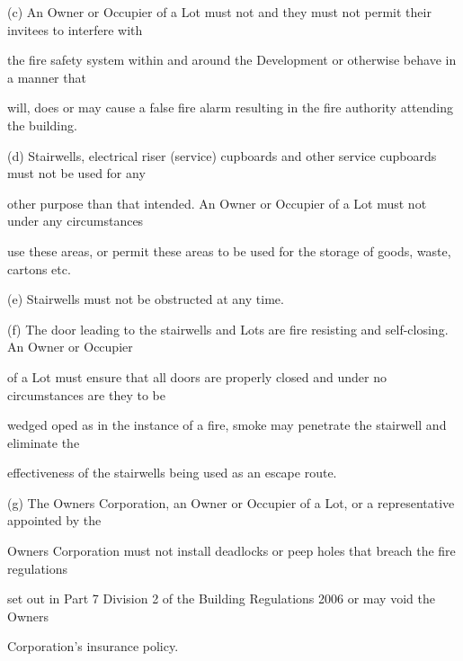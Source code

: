 \documentclass{article}
\begin{document}
{\fontsize{9.962}{1}(c) An Owner or Occupier of a Lot must not and they must not permit their invitees to interfere with }

{\fontsize{10.02}{1}the fire safety system within and around the Development or otherwise behave in a manner that }

{\fontsize{10.02}{1}will, does or may cause a false fire alarm resulting in the fire authority attending the building. }

\newpage



















{\fontsize{9.962}{1}(d) Stairwells, electrical riser (service) cupboards and other service cupboards must not be used for any }

{\fontsize{10.02}{1}other purpose than that intended. An Owner or Occupier of a Lot must not under any circumstances }

{\fontsize{10.02}{1}use these areas, or permit these areas to be used for the storage of goods, waste, cartons etc. }

{\fontsize{9.962}{1}(e) Stairwells must not be obstructed at any time. }

{\fontsize{9.962}{1}(f) The door leading to the stairwells and Lots are fire resisting and self-closing. An Owner or Occupier }

{\fontsize{10.02}{1}of a Lot must ensure that all doors are properly closed and under no circumstances are they to be }

{\fontsize{10.02}{1}wedged oped as in the instance of a fire, smoke may penetrate the stairwell and eliminate the }

{\fontsize{10.02}{1}effectiveness of the stairwells being used as an escape route. }

{\fontsize{9.962}{1}(g) The Owners Corporation, an Owner or Occupier of a Lot, or a representative appointed by the }

{\fontsize{10.02}{1}Owners Corporation must not install deadlocks or peep holes that breach the fire regulations }

{\fontsize{10.02}{1}set out in Part 7 Division 2 of the Building Regulations 2006 or may void the Owners }

{\fontsize{10.02}{1}Corporation’s insurance policy. }
\end{document}
